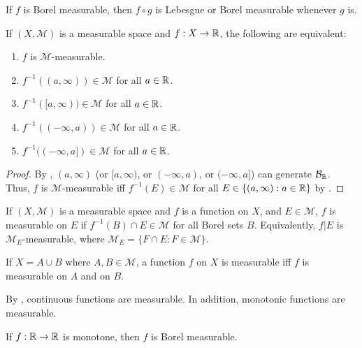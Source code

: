 \begin{remark}
    If $f$ is Borel measurable, then $f \circ g$ is Lebesgue or Borel measurable whenever $g$ is.
\end{remark}

\begin{proposition}
    If $(X, \mathcal{M})$ is a measurable space and $f: X \to \mathbb{R}$, the following are equivalent:
    \begin{enumerate}
        \item $f$ is $\mathcal{M}$-measurable.
        \item $f^{-1}((a, \infty)) \in \mathcal{M}$ for all $a \in \mathbb{R}$.
        \item $f^{-1}([a, \infty)) \in \mathcal{M}$ for all $a \in \mathbb{R}$.
        \item $f^{-1}((-\infty, a)) \in \mathcal{M}$ for all $a \in \mathbb{R}$.
        \item $f^{-1}((-\infty, a]) \in \mathcal{M}$ for all $a \in \mathbb{R}$.
    \end{enumerate}
\end{proposition}

\begin{proof}
    By , $(a, \infty)$ (or $[a, \infty)$, or $(-\infty, a)$, or $(-\infty, a]$) can generate $\mathcal{B}_{\mathbb{R}}$.
    Thus, $f$ is $\mathcal{M}$-measurable iff $f^{-1}(E) \in \mathcal{M}$ for all $E \in \{ (a, \infty): a \in \mathbb{R} \}$ by .
\end{proof}

\begin{definition}
    If $(X, \mathcal{M})$ is a measurable space and $f$ is a function on $X$, and $E \in \mathcal{M}$, $f$ is measurable on $E$ if $f^{-1}(B) \cap E \in \mathcal{M}$ for all Borel sets $B$.
    Equivalently, $f|E$ is $\mathcal{M}_E$-measurable, where $\mathcal{M}_E = \{ F \cap E: F \in \mathcal{M} \}$.
\end{definition}

\begin{proposition}
    If $X = A \cup B$ where $A, B \in \mathcal{M}$, a function $f$ on $X$ is measurable iff $f$ is measurable on $A$ and on $B$.
\end{proposition}

By , continuous functions are measurable.
In addition, monotonic functions are measurable.

\begin{proposition}
    If $f: \mathbb{R} \to \mathbb{R}$ is monotone, then $f$ is Borel measurable.
\end{proposition}

